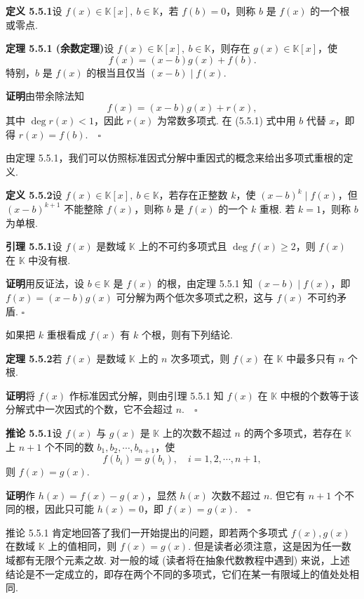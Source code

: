 \documentclass[UTF8, 12pt, fontset=fandol, oneside]{ctexart}
\begin{document}
\noindent\textbf{定义 5.5.1}\quad 设 $f(x)\in\mathbb{K}[x],\ b\in\mathbb{K}$，若 $f(b)=0$，则称 $b$ 是 $f(x)$ 的一个根或零点.

\noindent\textbf{定理 5.5.1 (余数定理)}\quad 设 $f(x)\in\mathbb{K}[x],\ b\in\mathbb{K}$，则存在 $g(x)\in\mathbb{K}[x]$，使
\[
f(x)=(x-b)g(x)+f(b).
\]
特别，$b$ 是 $f(x)$ 的根当且仅当 $(x-b)\mid f(x)$.

\noindent\textbf{证明}\quad 由带余除法知
\begin{equation}
f(x)=(x-b)g(x)+r(x),
\tag{5.5.1}
\end{equation}
其中 $\deg r(x)<1$，因此 $r(x)$ 为常数多项式. 在 (5.5.1) 式中用 $b$ 代替 $x$，即得 $r(x)=f(b).\quad \square$

由定理 5.5.1，我们可以仿照标准因式分解中重因式的概念来给出多项式重根的定义.

\noindent\textbf{定义 5.5.2}\quad 设 $f(x)\in\mathbb{K}[x],\ b\in\mathbb{K}$，若存在正整数 $k$，使 $(x-b)^k\mid f(x)$，但 $(x-b)^{k+1}$ 不能整除 $f(x)$，则称 $b$ 是 $f(x)$ 的一个 $k$ 重根. 若 $k=1$，则称 $b$ 为单根.

\noindent\textbf{引理 5.5.1}\quad 设 $f(x)$ 是数域 $\mathbb{K}$ 上的不可约多项式且 $\deg f(x)\geq 2$，则 $f(x)$ 在 $\mathbb{K}$ 中没有根.

\noindent\textbf{证明}\quad 用反证法，设 $b\in\mathbb{K}$ 是 $f(x)$ 的根，由定理 5.5.1 知 $(x-b)\mid f(x)$，即 $f(x)=(x-b)g(x)$ 可分解为两个低次多项式之积，这与 $f(x)$ 不可约矛盾. $\square$

如果把 $k$ 重根看成 $f(x)$ 有 $k$ 个根，则有下列结论.

\noindent\textbf{定理 5.5.2}\quad 若 $f(x)$ 是数域 $\mathbb{K}$ 上的 $n$ 次多项式，则 $f(x)$ 在 $\mathbb{K}$ 中最多只有 $n$ 个根.

\noindent\textbf{证明}\quad 将 $f(x)$ 作标准因式分解，则由引理 5.5.1 知 $f(x)$ 在 $\mathbb{K}$ 中根的个数等于该分解式中一次因式的个数，它不会超过 $n.\quad \square$

\noindent\textbf{推论 5.5.1}\quad 设 $f(x)$ 与 $g(x)$ 是 $\mathbb{K}$ 上的次数不超过 $n$ 的两个多项式，若存在 $\mathbb{K}$ 上 $n+1$ 个不同的数 $b_1,b_2,\cdots,b_{n+1}$，使
\[
f(b_i)=g(b_i),\quad i=1,2,\cdots,n+1,
\]
则 $f(x)=g(x)$.

\noindent\textbf{证明}\quad 作 $h(x)=f(x)-g(x)$，显然 $h(x)$ 次数不超过 $n$. 但它有 $n+1$ 个不同的根，因此只可能 $h(x)=0$，即 $f(x)=g(x).\quad \square$

推论 5.5.1 肯定地回答了我们一开始提出的问题，即若两个多项式 $f(x),g(x)$ 在数域 $\mathbb{K}$ 上的值相同，则 $f(x)=g(x)$. 但是读者必须注意，这是因为任一数域都有无限个元素之故. 对一般的域 (读者将在抽象代数教程中遇到) 来说，上述结论是不一定成立的，即存在两个不同的多项式，它们在某一有限域上的值处处相同.
\end{document}
